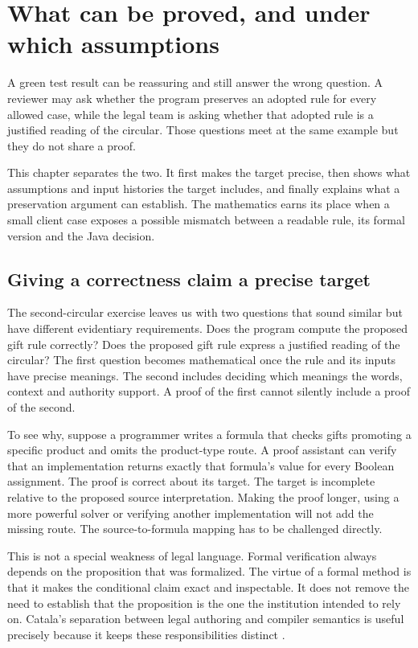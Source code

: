 \chapter{What can be proved, and under which assumptions}
\label{ch:proof}

A green test result can be reassuring and still answer the wrong question. A
reviewer may ask whether the program preserves an adopted rule for every allowed
case, while the legal team is asking whether that adopted rule is a justified
reading of the circular. Those questions meet at the same example but they do
not share a proof.

This chapter separates the two. It first makes the target precise, then shows
what assumptions and input histories the target includes, and finally explains
what a preservation argument can establish. The mathematics earns its place
when a small client case exposes a possible mismatch between a readable rule,
its formal version and the Java decision.


\section{Giving a correctness claim a precise target}
\label{merge:M03:00}

\label{sec:proof-target}
The second-circular exercise leaves us with two questions that sound similar but
have different evidentiary requirements. Does the program compute the proposed
gift rule correctly? Does the proposed gift rule express a justified reading of
the circular? The first question becomes mathematical once the rule and its
inputs have precise meanings. The second includes deciding which meanings the
words, context and authority support. A proof of the first cannot silently
include a proof of the second.

To see why, suppose a programmer writes a formula that checks gifts promoting a
specific product and omits the product-type route. A proof assistant can verify
that an implementation returns exactly that formula's value for every Boolean
assignment. The proof is correct about its target. The target is incomplete
relative to the proposed source interpretation. Making the proof longer, using a
more powerful solver or verifying another implementation will not add the
missing route. The source-to-formula mapping has to be challenged directly.

This is not a special weakness of legal language. Formal verification always
depends on the proposition that was formalized. The virtue of a formal method
is that it makes the conditional claim exact and inspectable. It does not remove
the need to establish that the proposition is the one the institution intended
to rely on. Catala's separation between legal authoring and compiler semantics
is useful precisely because it keeps these responsibilities distinct
\citep[core language and compilation sections]{catala2021}.

